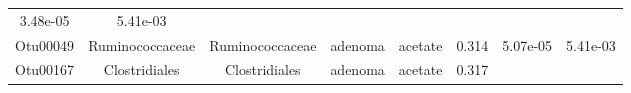 \documentclass[11pt,]{article}
\begin{document}
\begin{longtable}[]{@{}cccccccc@{}}
\begin{minipage}[t]{0.08\columnwidth}
3.48e-05\strut
\end{minipage} & \begin{minipage}[t]{0.08\columnwidth}\centering\strut
5.41e-03\strut
\end{minipage}\tabularnewline
\begin{minipage}[t]{0.08\columnwidth}\centering\strut
Otu00049\strut
\end{minipage} & \begin{minipage}[t]{0.15\columnwidth}\centering\strut
Ruminococcaceae\strut
\end{minipage} & \begin{minipage}[t]{0.15\columnwidth}\centering\strut
Ruminococcaceae\strut
\end{minipage} & \begin{minipage}[t]{0.08\columnwidth}\centering\strut
adenoma\strut
\end{minipage} & \begin{minipage}[t]{0.09\columnwidth}\centering\strut
acetate\strut
\end{minipage} & \begin{minipage}[t]{0.07\columnwidth}\centering\strut
0.314\strut
\end{minipage} & \begin{minipage}[t]{0.08\columnwidth}\centering\strut
5.07e-05\strut
\end{minipage} & \begin{minipage}[t]{0.08\columnwidth}\centering\strut
5.41e-03\strut
\end{minipage}\tabularnewline
\begin{minipage}[t]{0.08\columnwidth}\centering\strut
Otu00167\strut
\end{minipage} & \begin{minipage}[t]{0.15\columnwidth}\centering\strut
Clostridiales\strut
\end{minipage} & \begin{minipage}[t]{0.15\columnwidth}\centering\strut
Clostridiales\strut
\end{minipage} & \begin{minipage}[t]{0.08\columnwidth}\centering\strut
adenoma\strut
\end{minipage} & \begin{minipage}[t]{0.09\columnwidth}\centering\strut
acetate\strut
\end{minipage} & \begin{minipage}[t]{0.07\columnwidth}\centering\strut
0.317\strut
\end{minipage} & \begin{minipage}[t]{0.08\columnwidth}\centering\strut

\end{minipage}
\end{longtable}
\end{document}
